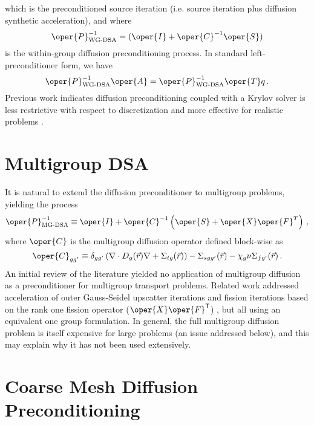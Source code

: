 which is the preconditioned source iteration (i.e. source iteration 
plus diffusion synthetic acceleration), and where
\begin{equation}
 \oper{P}^{-1}_{\text{WG-DSA}}
   = (\oper{I} + \oper{C}^{-1} \oper{S})
\end{equation}
is the within-group diffusion preconditioning process.  In standard 
left-preconditioner form, we have
\begin{equation}
  \oper{P}_{\text{WG-DSA}}^{-1}\oper{A}
   =  \oper{P}^{-1}_{\text{WG-DSA}} \oper{T} q \, .
\end{equation}
Previous work indicates diffusion preconditioning coupled with a 
Krylov solver is less restrictive with respect to discretization and more 
effective for realistic problems \cite{warsa2004kim}.

\section{Multigroup DSA}

It is natural to extend the diffusion preconditioner to multigroup 
problems, yielding the process
\begin{equation}
  \oper{P}^{-1}_{\text{MG-DSA}} \equiv 
    \oper{I} + \oper{C}^{-1} 
     \left(\oper{S} + \oper{X}\oper{F}^T\right) \, ,
\label{eq:mgdsa}
\end{equation}
where $\oper{C}$ is the multigroup diffusion operator 
defined block-wise as
\begin{equation}
 \oper{C}_{gg'} \equiv 
   \delta_{gg'} 
   \left( \nabla \cdot D_g(\vec{r}) \nabla + \Sigma_{tg}(\vec{r}) \right ) 
   - \Sigma_{sgg'}(\vec{r}) - \chi_g \nu\Sigma_{fg'}(\vec{r}) \, .
\end{equation}
An initial review of the literature yielded no application of
multigroup diffusion 
as a preconditioner for multigroup transport problems.  
Related work addressed 
acceleration of outer Gauss-Seidel upscatter iterations \cite{adams1993tga}
and fission iterations based on the rank one fission 
operator ($\oper{X}\oper{F}^{\transp}$) \cite{morel1994fsa}, 
but all using an equivalent one group formulation.  
In general, the full multigroup diffusion problem is itself expensive
for large problems (an issue addressed below), and this may explain why  
it has not been used extensively.  

\section{Coarse Mesh Diffusion Preconditioning}

